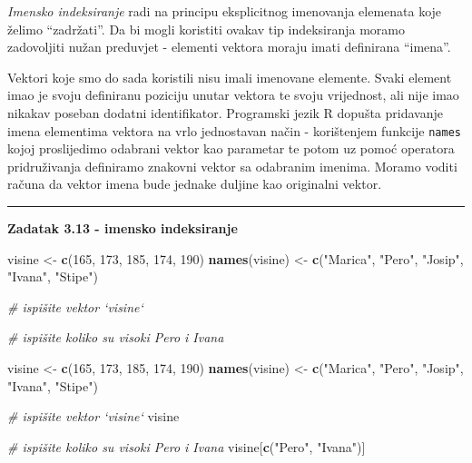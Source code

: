 \documentclass[]{book}
\newenvironment{Shaded}{\begin{snugshade}}{\end{snugshade}}
\newcommand{\KeywordTok}[1]{\textcolor[rgb]{0.13,0.29,0.53}{\textbf{#1}}}
\newcommand{\DecValTok}[1]{\textcolor[rgb]{0.00,0.00,0.81}{#1}}
\newcommand{\StringTok}[1]{\textcolor[rgb]{0.31,0.60,0.02}{#1}}
\newcommand{\CommentTok}[1]{\textcolor[rgb]{0.56,0.35,0.01}{\textit{#1}}}
\newcommand{\NormalTok}[1]{#1}
\theoremstyle{definition}
\theoremstyle{definition}
\theoremstyle{definition}
\theoremstyle{remark}
\begin{document}
\emph{Imensko indeksiranje} radi na principu eksplicitnog imenovanja
elemenata koje želimo ``zadržati''. Da bi mogli koristiti ovakav tip
indeksiranja moramo zadovoljiti nužan preduvjet - elementi vektora
moraju imati definirana ``imena''.

Vektori koje smo do sada koristili nisu imali imenovane elemente. Svaki
element imao je svoju definiranu poziciju unutar vektora te svoju
vrijednost, ali nije imao nikakav poseban dodatni identifikator.
Programski jezik R dopušta pridavanje imena elementima vektora na vrlo
jednostavan način - korištenjem funkcije \texttt{names} kojoj
proslijedimo odabrani vektor kao parametar te potom uz pomoć operatora
pridruživanja definiramo znakovni vektor sa odabranim imenima. Moramo
voditi računa da vektor imena bude jednake duljine kao originalni
vektor.

\begin{center}\rule{0.5\linewidth}{\linethickness}\end{center}

\textbf{Zadatak 3.13 - imensko indeksiranje}

\begin{Shaded}
\begin{Highlighting}[]
\NormalTok{visine <-}\StringTok{ }\KeywordTok{c}\NormalTok{(}\DecValTok{165}\NormalTok{, }\DecValTok{173}\NormalTok{, }\DecValTok{185}\NormalTok{, }\DecValTok{174}\NormalTok{, }\DecValTok{190}\NormalTok{)}
\KeywordTok{names}\NormalTok{(visine) <-}\StringTok{ }\KeywordTok{c}\NormalTok{(}\StringTok{"Marica"}\NormalTok{, }\StringTok{"Pero"}\NormalTok{, }\StringTok{"Josip"}\NormalTok{, }\StringTok{"Ivana"}\NormalTok{, }\StringTok{"Stipe"}\NormalTok{)}

\CommentTok{# ispišite vektor `visine`}


\CommentTok{# ispišite koliko su visoki Pero i Ivana}
\end{Highlighting}
\end{Shaded}

\begin{Shaded}
\begin{Highlighting}[]
\NormalTok{visine <-}\StringTok{ }\KeywordTok{c}\NormalTok{(}\DecValTok{165}\NormalTok{, }\DecValTok{173}\NormalTok{, }\DecValTok{185}\NormalTok{, }\DecValTok{174}\NormalTok{, }\DecValTok{190}\NormalTok{)}
\KeywordTok{names}\NormalTok{(visine) <-}\StringTok{ }\KeywordTok{c}\NormalTok{(}\StringTok{"Marica"}\NormalTok{, }\StringTok{"Pero"}\NormalTok{, }\StringTok{"Josip"}\NormalTok{, }\StringTok{"Ivana"}\NormalTok{, }\StringTok{"Stipe"}\NormalTok{)}

\CommentTok{# ispišite vektor `visine`}
\NormalTok{visine}

\CommentTok{# ispišite koliko su visoki Pero i Ivana}
\NormalTok{visine[}\KeywordTok{c}\NormalTok{(}\StringTok{"Pero"}\NormalTok{, }\StringTok{"Ivana"}\NormalTok{)]}
\end{Highlighting}
\end{Shaded}
\end{document}
